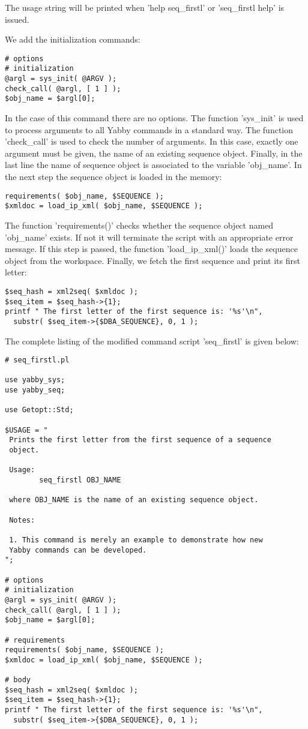 The usage string will be printed when 'help seq\_firstl' or
'seq\_firstl help' is issued.

We add the initialization commands:

\begin{verbatim}
# options
# initialization
@argl = sys_init( @ARGV );
check_call( @argl, [ 1 ] );
$obj_name = $argl[0];
\end{verbatim}

In the case of this command there are no options. The function
'sys\_init' is used to process arguments to all Yabby commands
in a standard way. The function 'check\_call' is used to check
the number of arguments.  In this case, exactly one argument
must be given, the name of an existing sequence object.  Finally,
in the last line the name of sequence object is associated to
the variable 'obj\_name'. In the next step the sequence object
is loaded in the memory:
 
\begin{verbatim}
requirements( $obj_name, $SEQUENCE );
$xmldoc = load_ip_xml( $obj_name, $SEQUENCE );
\end{verbatim}

The function 'requirements()' checks whether the sequence object
named 'obj\_name' exists. If not it will terminate the script
with an appropriate error message. If this step is passed, the
function 'load\_ip\_xml()' loads the sequence object from the
workspace. Finally, we fetch the first sequence and print its
first letter:

\begin{verbatim}
$seq_hash = xml2seq( $xmldoc );
$seq_item = $seq_hash->{1};
printf " The first letter of the first sequence is: '%s'\n",
  substr( $seq_item->{$DBA_SEQUENCE}, 0, 1 );
\end{verbatim}

The complete listing of the modified command script 'seq\_firstl'
is given below: 

\begin{verbatim}
# seq_firstl.pl

use yabby_sys;
use yabby_seq;

use Getopt::Std;

$USAGE = "
 Prints the first letter from the first sequence of a sequence
 object. 

 Usage:
        seq_firstl OBJ_NAME

 where OBJ_NAME is the name of an existing sequence object.

 Notes:

 1. This command is merely an example to demonstrate how new
 Yabby commands can be developed.
";

# options
# initialization
@argl = sys_init( @ARGV );
check_call( @argl, [ 1 ] );
$obj_name = $argl[0];

# requirements
requirements( $obj_name, $SEQUENCE );
$xmldoc = load_ip_xml( $obj_name, $SEQUENCE );

# body
$seq_hash = xml2seq( $xmldoc );
$seq_item = $seq_hash->{1};
printf " The first letter of the first sequence is: '%s'\n",
  substr( $seq_item->{$DBA_SEQUENCE}, 0, 1 );
\end{verbatim}

